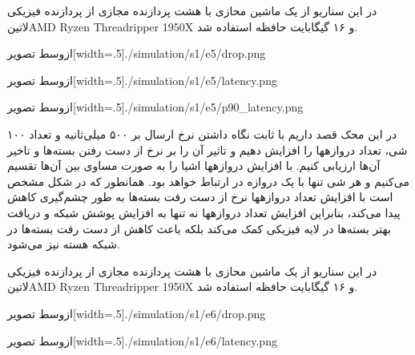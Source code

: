 در این سناریو از یک ماشین محازی با هشت پردازنده مجازی از پردازنده فیزیکی
‌لاتین{AMD Ryzen Threadripper 1950X}
و ۱۶ گیگابایت حافظه استفاده شد.

‌ازوسط
‌تصویر[width=.5\textwidth]{./simulation/s1/e5/drop.png}

‌ازوسط
‌تصویر[width=.5\textwidth]{./simulation/s1/e5/latency.png}

‌ازوسط
‌تصویر[width=.5\textwidth]{./simulation/s1/e5/p90_latency.png}



در این محک قصد داریم با ثابت نگاه داشتن نرخ ارسال بر ۵۰۰ میلی‌ثانیه و تعداد ۱۰۰ شی، تعداد دروازهها را افزایش دهیم و تاثیر آن را بر نرخ از دست رفتن بسته‌ها و تاخیر آن‌ها ارزیابی کنیم.
با افزایش دروازهها اشیا را به صورت مساوی بین آن‌ها تقسیم می‌کنیم و هر شی تنها با یک دروازه در ارتباط خواهد بود.
همانطور که در شکل  مشخص است
با افزایش تعداد دروازهها نرخ از دست رفت بسته‌ها به طور چشم‌گیری کاهش پیدا می‌کند، بنابراین افزایش تعداد دروازهها نه تنها
به افزایش پوشش شبکه و دریافت بهتر بسته‌ها در لایه فیزیکی کمک می‌کند بلکه باعث کاهش از دست رفت بسته‌ها در شبکه هسته نیز می‌شود.

در این سناریو از یک ماشین محازی با هشت پردازنده مجازی از پردازنده فیزیکی
‌لاتین{AMD Ryzen Threadripper 1950X}
و ۱۶ گیگابایت حافظه استفاده شد.

‌ازوسط
‌تصویر[width=.5\textwidth]{./simulation/s1/e6/drop.png}

‌ازوسط
‌تصویر[width=.5\textwidth]{./simulation/s1/e6/latency.png}

